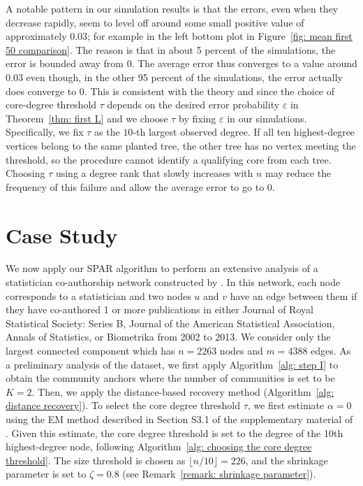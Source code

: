 \documentclass[twoside,11pt]{article}
\theoremstyle{remark}
\begin{document}
A notable pattern in our simulation results is that the errors, even when they decrease rapidly, seem to level off around some small positive value of approximately $0.03$; for example in the left bottom plot in Figure~\ref{fig: mean first 50 comparison}. The reason is that in about 5 percent of the simulations, the error is bounded away from 0. The average error thus converges to a value around 0.03 even though, in the other 95 percent of the simulations, the error actually does converge to 0. This is consistent with the theory and since the choice of core-degree threshold $\tau$ depends on the desired error probability $\varepsilon$ in Theorem~\ref{thm: first L} and we choose $\tau$ by fixing $\varepsilon$ in our simulations. Specifically, we fix $\tau$ as the $10$-th largest observed degree. If all ten highest-degree vertices belong to the same planted tree, the other tree has no vertex meeting the threshold, so the procedure cannot identify a qualifying core from each tree. Choosing $\tau$ using a degree rank that slowly increases with $n$ may reduce the frequency of this failure and allow the average error to go to 0. 



\section{Case Study}
\label{sec: case study}
We now apply our SPAR algorithm to perform an extensive analysis of a statistician co-authorship network constructed by \cite{ji2016coauthorship}.
In this network, each node corresponds to a statistician and two nodes $u$ and $v$ have an edge between them if they have co-authored 1 or more publications in either Journal of Royal Statistical Society: Series B, Journal of the American Statistical Association, Annals of Statistics, or Biometrika from 2002 to 2013. 
We consider only the largest connected component which has $n=2263$ nodes and $m=4388$ edges. 
As a preliminary analysis of the dataset, we first apply Algorithm~\ref{alg: step I} to obtain the community anchors where the number of communities is set to be $K = 2$. Then, we apply the distance-based recovery method (Algorithm~\ref{alg: distance recovery}). 
To select the core degree threshold $\tau$, we first estimate $\alpha = 0$ using the EM method described in Section S3.1 of the supplementary material of \cite{crane2024root}.
Given this estimate, the core degree threshold is set to the degree of the 10th highest-degree node, following Algorithm~\ref{alg: choosing the core degree threshold}.
The size threshold is chosen as $\lfloor n/10 \rfloor = 226$, and the shrinkage parameter is set to $\zeta = 0.8$ (see Remark~\ref{remark: shrinkage parameter}).
\end{document}
